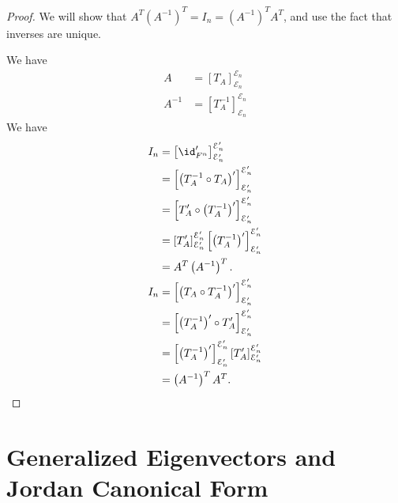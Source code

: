 \documentclass[10pt]{mypackage}
\begin{document}
\begin{proof}
  We will show that $A^{T} \left(A^{-1}\right)^{T} = I_n = \left(A^{-1}\right)^{T} A^T$, and use the fact that inverses are unique.\newline

  We have
  \begin{align*}
    A &= \left[T_A\right]_{\mathcal{E}_n}^{\mathcal{E}_n}\\
    A^{-1} &= \left[T_A^{-1}\right]_{\mathcal{E}_n}^{\mathcal{E}_n}
  \end{align*}
  We have
  \begin{align*}
    I_n &= \left[\id_{F^n}'\right]_{\mathcal{E}_n'}^{\mathcal{E}_n'}\\
        &= \left[\left(T_A^{-1}\circ T_A\right)'\right]_{\mathcal{E}_n'}^{\mathcal{E}_n'}\\
        &= \left[T_A'\circ \left(T_A^{-1}\right)'\right]_{\mathcal{E}_n'}^{\mathcal{E}_n'}\\
        &= \left[T_A'\right]_{\mathcal{E}_n'}^{\mathcal{E}_n'}\left[\left(T_A^{-1}\right)'\right]_{\mathcal{E}_n'}^{\mathcal{E}_n'}\\
        &= A^T\left(A^{-1}\right)^T.\\
    I_n &= \left[\left(T_A\circ T_A^{-1}\right)'\right]_{\mathcal{E}_n'}^{\mathcal{E}_n'}\\
        &= \left[\left(T_A^{-1}\right)'\circ T_A'\right]_{\mathcal{E}_n'}^{\mathcal{E}_n'}\\
        &= \left[\left(T_A^{-1}\right)'\right]_{\mathcal{E}_n'}^{\mathcal{E}_n'}\left[T_A'\right]_{\mathcal{E}_n'}^{\mathcal{E}_n'}\\
        &= \left(A^{-1}\right)^{T}A^{T}.
  \end{align*}
\end{proof}
\section{Generalized Eigenvectors and Jordan Canonical Form}%
\end{document}
